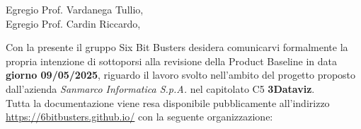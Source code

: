         \noindent Egregio Prof. Vardanega Tullio, \\
        Egregio Prof. Cardin Riccardo,
        \newline
        
        \noindent Con la presente il gruppo Six Bit Busters desidera comunicarvi formalmente la propria
        intenzione di sottoporsi alla revisione della Product Baseline in data \textbf{giorno 09/05/2025}, riguardo il lavoro svolto nell'ambito del progetto proposto dall'azienda \textit{Sanmarco Informatica S.p.A.}
        nel capitolato C5 \textbf{3Dataviz}.\\

        \noindent Tutta la documentazione viene resa disponibile pubblicamente all'indirizzo \url{https://6bitbusters.github.io/} con la
        seguente organizzazione:

